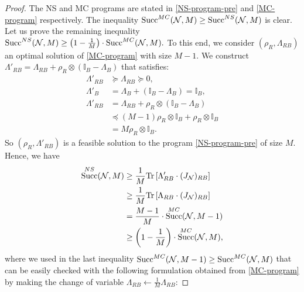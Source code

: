 \documentclass[10pt,a4paper]{amsart}
\DeclareMathOperator{\suc}{Succ}
\newcommand*{\cN}{\mathcal{N}}
\newcommand*{\cS}{\mathcal{S}}
\newcommand*{\dI}{\mathbb{I}}
\newcommand*{\mge}{\succcurlyeq}
\newcommand*{\mle}{\preccurlyeq}
\newcommand*{\tr}[1]{\mathrm{Tr}\left[#1\right]}
\begin{document}
\begin{proof}
The NS and MC programs are stated in  \eqref{NS-program-pre} and \eqref{MC-program} respectively. 
\sloppy The inequality $\suc^{\rm{MC}}(\cN,M)\ge  \suc^{\rm{NS}}(\cN,M)$ is clear. Let us prove the remaining inequality $      \suc^{\rm{NS}}(\cN,M) \ge \left(1-\frac{1}{M}\right)\cdot \suc^{\rm{MC}}(\cN,M).$ To this end, we consider $(\rho_R,\Lambda_{RB})$ an optimal solution of \eqref{MC-program} with size $M-1$. We construct $ \Lambda'_{RB} = \Lambda_{RB} + \rho_R\otimes (\dI_B-\Lambda_B)$ that satisfies:
\begin{align}
    \Lambda'_{RB}&\mge \Lambda_{RB}\mge 0,
    \\\Lambda'_{B} &= \Lambda_{B} + (\dI_B-\Lambda_B)=\dI_B,
    \\\Lambda'_{RB} &= \Lambda_{RB} + \rho_R\otimes (\dI_B-\Lambda_B)
    \\&\mle (M-1)\rho_R \otimes  \mathbb{I}_B+ \rho_R\otimes \dI_B 
    \\&= M\rho_R \otimes  \mathbb{I}_B.
\end{align}
So $(\rho_R,\Lambda'_{RB})$ is a feasible solution to the program \eqref{NS-program-pre} of size $M$. Hence, we have
\begin{align}
    \suc_{}^{\rm{NS}}(\cN,M)&\ge \frac{1}{M} \tr{\Lambda'_{RB} \cdot (J_{\cN})_{RB}} 
    \\&\ge \frac{1}{M}\tr{\Lambda_{RB} \cdot (J_{\cN})_{RB}}
    \\&= \frac{M-1}{M}\cdot \suc_{}^{\rm{MC}}(\cN,M-1)
    \\&\ge \left(1-\frac{1}{M}\right)\cdot\suc_{}^{\rm{MC}}(\cN,M),
\end{align}
where we used in the last inequality $\suc_{}^{\rm{MC}}(\cN, M-1)\ge \suc_{}^{\rm{MC}}(\cN,M)$ that can be easily checked with the following formulation obtained from \eqref{MC-program} by making the change of variable $\Lambda_{RB}\leftarrow \frac{1}{M} \Lambda_{RB}$:

\end{proof}
\end{document}
